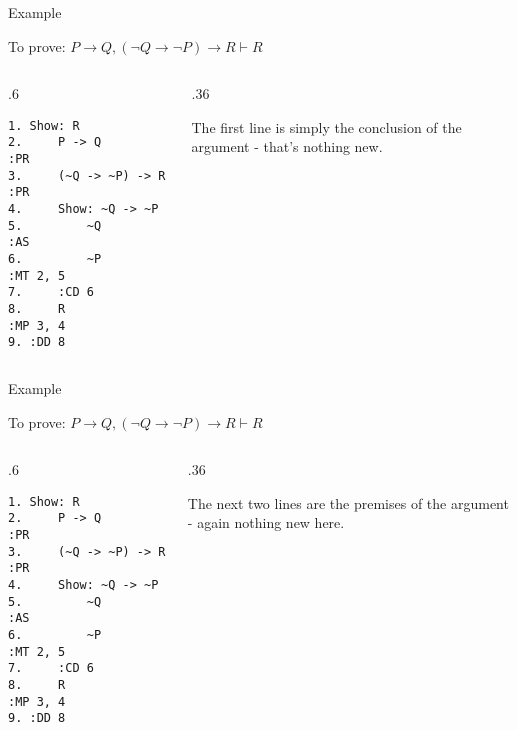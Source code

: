 \documentclass[
  ignorenonframetext,
]{beamer}
\renewcommand{\,}{\text{, }}
\def\begincols{\begin{columns}}
\def\begincol{\begin{column}}
\def\endcol{\end{column}}
\def\endcols{\end{columns}}
\begin{document}
\begin{frame}[fragile]{Example}
\protect\hypertarget{example-1}{}

To prove:
\(P \rightarrow Q, (\neg Q \rightarrow \neg P) \rightarrow R \vdash R\)

\bigskip

\begincols
\begincol{.6\textwidth}

\begin{verbatim}
1. Show: R
2.     P -> Q            :PR
3.     (~Q -> ~P) -> R   :PR
4.     Show: ~Q -> ~P
5.         ~Q            :AS
6.         ~P            :MT 2, 5
7.     :CD 6
8.     R                 :MP 3, 4
9. :DD 8
\end{verbatim}

\endcol
\begincol{.36\textwidth}

The first line is simply the conclusion of the argument - that's nothing
new.

\endcol
\endcols

\end{frame}

\begin{frame}[fragile]{Example}
\protect\hypertarget{example-2}{}

To prove:
\(P \rightarrow Q, (\neg Q \rightarrow \neg P) \rightarrow R \vdash R\)

\bigskip

\begincols
\begincol{.6\textwidth}

\begin{verbatim}
1. Show: R
2.     P -> Q            :PR
3.     (~Q -> ~P) -> R   :PR
4.     Show: ~Q -> ~P
5.         ~Q            :AS
6.         ~P            :MT 2, 5
7.     :CD 6
8.     R                 :MP 3, 4
9. :DD 8
\end{verbatim}

\endcol
\begincol{.36\textwidth}

The next two lines are the premises of the argument - again nothing new
here.

\endcol
\endcols

\end{frame}
\end{document}
